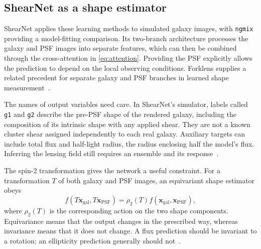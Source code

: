 \subsection{ShearNet as a shape estimator}
\label{sec:shearnet}


ShearNet applies these learning methods to simulated galaxy images, with \texttt{ngmix} providing a model-fitting comparison. Its two-branch architecture processes the galaxy and PSF images into separate features, which can then be combined through the cross-attention in \cref{eq:attention}. Providing the PSF explicitly allows the prediction to depend on the local observing conditions. Forklens supplies a related precedent for separate galaxy and PSF branches in learned shape measurement~\cite{field_shearnet_2026,zhang_forklens_2024}.

The names of output variables need care. In ShearNet's simulator, labels called \texttt{g1} and \texttt{g2} describe the pre-PSF shape of the rendered galaxy, including the composition of its intrinsic shape with any applied shear. They are not a known cluster shear assigned independently to each real galaxy. Auxiliary targets can include total flux and half-light radius, the radius enclosing half the model's flux. Inferring the lensing field still requires an ensemble and its response~\cite{field_shearnet_2026}.

The spin-2 transformation gives the network a useful constraint. For a transformation $T$ of both galaxy and PSF images, an equivariant shape estimator obeys
\begin{equation}
    f(T\boldsymbol{x}_{\mathrm{gal}},T\boldsymbol{x}_{\mathrm{PSF}})
    =\rho_2(T)f(\boldsymbol{x}_{\mathrm{gal}},\boldsymbol{x}_{\mathrm{PSF}}),
    \label{eq:equivariance}
\end{equation}
where $\rho_2(T)$ is the corresponding action on the two shape components. Equivariance means that the output changes in the prescribed way, whereas invariance means that it does not change. A flux prediction should be invariant to a rotation; an ellipticity prediction generally should not~\cite{cohen_group_2016,lin_dcnnanacal_2026}.

